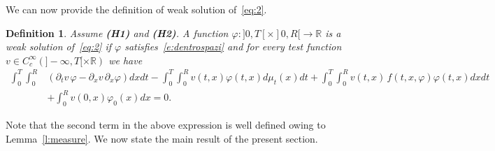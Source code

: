 \documentclass[11pt,leqno]{amsart}
\newtheorem{definition}{Definition}[section]
\numberwithin{equation}{section}
\begin{document}
We can now provide the definition of weak solution of~\eqref{eq:2}.
\begin{definition}
  \label{def:sol}
  Assume {\rm  {\bf (H1)}} and {\rm {\bf (H2)}}. 
  A function ${\varphi}:]0,T[ \times ]0,R[ \to{\mathbb{R}}$ is a \emph{weak solution} of~\eqref{eq:2} if ${\varphi}$ 
  satisfies~\eqref{e:dentrospazi} and for every test function $v \in C_c^\infty(]-\infty,T[ \times {\mathbb{R}})$ we have
  \begin{equation}
\label{eq:2.9}
\begin{split}
\int_0^T \! \! \int_0^R & \left({\partial_t} v \, {\varphi} - 
{\partial_x } v\, {\partial_x } {\varphi}\right) dx dt-\int_0^T \! \!  \int_0^Rv(t, x) {\varphi}(t, x)  d\mu_t(x)dt 
 +\int_0^T \! \!  \int_0^R v (t, x) \, f(t,x,{\varphi}) {\varphi} (t, x) dxdt \\
 & +\int_0^Rv(0,x){\varphi}_0(x)dx=0.
\end{split}
\end{equation}
\end{definition}
Note that the second term in the above expression is well defined owing to Lemma~\ref{l:measure}. 
We now state the main result of the present section. 
\end{document}
